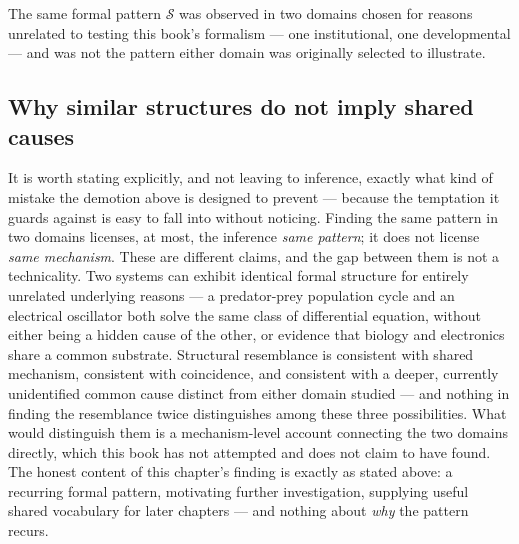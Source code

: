 \begin{observation}
The same formal pattern $\mathcal{S}$ was observed in two domains chosen for reasons unrelated to testing this book's formalism --- one institutional, one developmental --- and was not the pattern either domain was originally selected to illustrate.
\end{observation}

\subsection*{Why similar structures do not imply shared causes}

It is worth stating explicitly, and not leaving to inference, exactly what kind of mistake the demotion above is designed to prevent --- because the temptation it guards against is easy to fall into without noticing. Finding the same pattern in two domains licenses, at most, the inference \emph{same pattern}; it does not license \emph{same mechanism}. These are different claims, and the gap between them is not a technicality. Two systems can exhibit identical formal structure for entirely unrelated underlying reasons --- a predator-prey population cycle and an electrical oscillator both solve the same class of differential equation, without either being a hidden cause of the other, or evidence that biology and electronics share a common substrate. Structural resemblance is consistent with shared mechanism, consistent with coincidence, and consistent with a deeper, currently unidentified common cause distinct from either domain studied --- and nothing in finding the resemblance twice distinguishes among these three possibilities. What would distinguish them is a mechanism-level account connecting the two domains directly, which this book has not attempted and does not claim to have found. The honest content of this chapter's finding is exactly as stated above: a recurring formal pattern, motivating further investigation, supplying useful shared vocabulary for later chapters --- and nothing about \emph{why} the pattern recurs.

